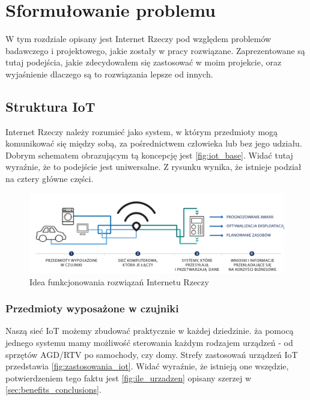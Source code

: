 \section{Sformułowanie problemu}
\label{sec:sformulowanie-problemu}
W tym rozdziale opisany jest Internet Rzeczy pod względem problemów badawczego i projektowego, jakie zostały w pracy rozwiązane. Zaprezentowane są tutaj podejścia, jakie zdecydowałem się zastosować w moim projekcie, oraz wyjaśnienie dlaczego są to rozwiązania lepsze od innych. 

\subsection{Struktura IoT}
Internet Rzeczy należy rozumieć jako system, w którym przedmioty mogą komunikować się między sobą, za pośrednictwem człowieka lub bez jego udziału.
Dobrym schematem obrazującym tą koncepcję jest \autoref{fig:iot_base}. Widać tutaj wyraźnie, że to podejście jest uniwersalne. Z rysunku wynika, że istnieje podział na cztery główne części.

\begin{figure}[!htbp]
	\centering
	\includegraphics[width=1.0\textwidth]{images/iot.png}
	\caption[Idea funkcjonowania rozwiązań Internetu Rzeczy.]{Idea funkcjonowania rozwiązań Internetu Rzeczy}
	\label{fig:iot_base}
\end{figure}

\subsubsection{Przedmioty wyposażone w czujniki}
Naszą sieć IoT możemy zbudować praktycznie w każdej dziedzinie. ża pomocą jednego systemu mamy możliwość sterowania każdym rodzajem urządzeń - od sprzętów AGD/RTV po samochody, czy domy. Strefy zastosowań urządzeń IoT przedstawia \autoref{fig:zastosowania_iot}. Widać wyraźnie, że istnieją one wszędzie, potwierdzeniem tego faktu jest \autoref{fig:ile_urzadzen} opisany szerzej w \autoref{sec:benefits_conclusions}.

